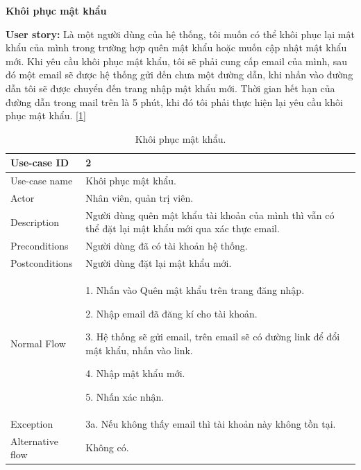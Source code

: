 \textbf{Khôi phục mật khẩu}\par
\textbf{User story:} Là một người dùng của hệ thống, tôi muốn có thể khôi phục lại mật khẩu của mình trong trường hợp quên mật khẩu hoặc muốn cập nhật mật khẩu mới. Khi yêu cầu khôi phục mật khẩu, tôi sẽ phải cung cấp email của mình, sau đó một email sẽ được hệ thống gửi đến chưa một đường dẫn, khi nhấn vào đường dẫn tôi sẽ được chuyển đến trang nhập mật khẩu mới. Thời gian hết hạn của đường dẫn trong mail trên là 5 phút, khi đó tôi phải thực hiện lại yêu cầu khôi phục mật khẩu. [\ref{bang2}]
\begin{table}[!htp]
    \centering
    \begin{tabular}{|m{3cm}|m{10cm}|}
    \hline 
        Use-case ID & 2\\ \hline
        Use-case name & Khôi phục mật khẩu.\\ \hline
        Actor & Nhân viên, quản trị viên.\\ \hline
        Description & Người dùng quên mật khẩu tài khoản của mình thì vẫn có thể đặt lại mật khẩu mới qua xác thực email.\\ \hline
        Preconditions & Người dùng đã có tài khoản hệ thống.\\ \hline
        Postconditions & Người dùng đặt lại mật khẩu mới.\\ \hline
        Normal Flow & 
        1. Nhấn vào Quên mật khẩu trên trang đăng nhập.\par
        2. Nhập email đã đăng kí cho tài khoản.\par
        3. Hệ thống sẽ gửi email, trên email sẽ có đường link để đổi mật khẩu, nhấn vào link.\par
        4. Nhập mật khẩu mới.\par
        5. Nhấn xác nhận.
        \\ \hline
        Exception & 3a. Nếu không thấy email thì tài khoản này không tồn tại.\\ \hline
        Alternative flow & Không có.\\ 
    \hline 
    \end{tabular}
    \caption{Khôi phục mật khẩu.}
    \label{bang2}
\end{table}

